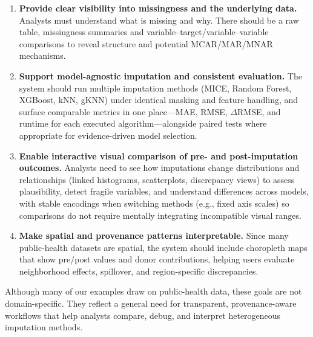 \documentclass{egpubl}
\begin{document}
\begin{enumerate}[label=\textbf{DG\arabic*}, leftmargin=*]
  \item \textbf{Provide clear visibility into missingness and the underlying data.} Analysts must understand what is missing and why. There should be a raw table, missingness summaries and variable–target/variable–variable comparisons to reveal structure and potential MCAR/MAR/MNAR mechanisms.
  \item \textbf{Support model-agnostic imputation and consistent evaluation.} The system should run multiple imputation methods (MICE, Random Forest, XGBoost, kNN, gKNN) under identical masking and feature handling, and surface comparable metrics in one place---MAE, RMSE, $\Delta$RMSE, and runtime for each executed algorithm---alongside paired tests where appropriate for evidence-driven model selection.
  \item \textbf{Enable interactive visual comparison of pre- and post-imputation outcomes.} Analysts need to see how imputations change distributions and relationships (linked histograms, scatterplots, discrepancy views) to assess plausibility, detect fragile variables, and understand differences across models, with stable encodings when switching methods (e.g., fixed axis scales) so comparisons do not require mentally integrating incompatible visual ranges.
  \item \textbf{Make spatial and provenance patterns interpretable.} Since many public-health datasets are spatial, the system should include choropleth maps that show pre/post values and donor contributions, helping users evaluate neighborhood effects, spillover, and region-specific discrepancies.
\end{enumerate}

Although many of our examples draw on public-health data, these goals are not domain-specific. They reflect a general need for transparent, provenance-aware workflows that help analysts compare, debug, and interpret heterogeneous imputation methods.
\end{document}
